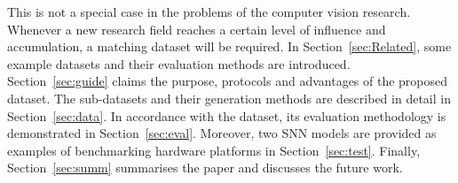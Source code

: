 This is not a special case in the problems of the computer vision research.
Whenever a new research field reaches a certain level of influence and accumulation, a matching dataset will be required.
In Section~\ref{sec:Related}, some example datasets and their evaluation methods are introduced.
Section~\ref{sec:guide} claims the purpose, protocols and advantages of the proposed dataset.
The sub-datasets and their generation methods are described in detail in Section~\ref{sec:data}.
In accordance with the dataset, its evaluation methodology is demonstrated in Section~\ref{sec:eval}.
Moreover, two SNN models are provided as examples of benchmarking hardware platforms in Section~\ref{sec:test}.
Finally, Section~\ref{sec:summ} summarises the paper and discusses the future work.